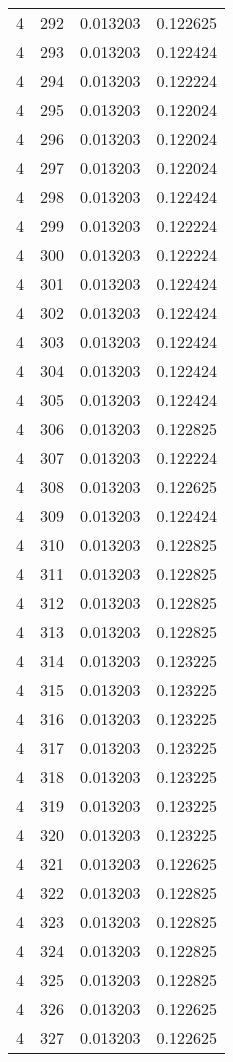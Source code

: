 \begin{longtable}{rrrr}
4 & 292 & 0.013203 & 0.122625 \\
4 & 293 & 0.013203 & 0.122424 \\
4 & 294 & 0.013203 & 0.122224 \\
4 & 295 & 0.013203 & 0.122024 \\
4 & 296 & 0.013203 & 0.122024 \\
4 & 297 & 0.013203 & 0.122024 \\
4 & 298 & 0.013203 & 0.122424 \\
4 & 299 & 0.013203 & 0.122224 \\
4 & 300 & 0.013203 & 0.122224 \\
4 & 301 & 0.013203 & 0.122424 \\
4 & 302 & 0.013203 & 0.122424 \\
4 & 303 & 0.013203 & 0.122424 \\
4 & 304 & 0.013203 & 0.122424 \\
4 & 305 & 0.013203 & 0.122424 \\
4 & 306 & 0.013203 & 0.122825 \\
4 & 307 & 0.013203 & 0.122224 \\
4 & 308 & 0.013203 & 0.122625 \\
4 & 309 & 0.013203 & 0.122424 \\
4 & 310 & 0.013203 & 0.122825 \\
4 & 311 & 0.013203 & 0.122825 \\
4 & 312 & 0.013203 & 0.122825 \\
4 & 313 & 0.013203 & 0.122825 \\
4 & 314 & 0.013203 & 0.123225 \\
4 & 315 & 0.013203 & 0.123225 \\
4 & 316 & 0.013203 & 0.123225 \\
4 & 317 & 0.013203 & 0.123225 \\
4 & 318 & 0.013203 & 0.123225 \\
4 & 319 & 0.013203 & 0.123225 \\
4 & 320 & 0.013203 & 0.123225 \\
4 & 321 & 0.013203 & 0.122625 \\
4 & 322 & 0.013203 & 0.122825 \\
4 & 323 & 0.013203 & 0.122825 \\
4 & 324 & 0.013203 & 0.122825 \\
4 & 325 & 0.013203 & 0.122825 \\
4 & 326 & 0.013203 & 0.122625 \\
4 & 327 & 0.013203 & 0.122625 \\

\end{longtable}
